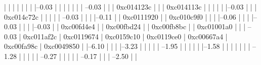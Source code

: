             |          |          |                     |          
            |          |          |                     |--0.03%
            |          |          |                     |          
            |          |          |                      --0.03%
            |          |          |                                0xc014123c
            |          |          |                                0xc014113c
            |          |          |          
            |          |          |--0.03%
            |          |          |          0xc014c72c
            |          |          |          
            |          |           --0.03%
            |          |          
            |          |--0.11%
            |          |          0xc0111920
            |          |          0xc010c9f0
            |          |          
            |          |--0.06%
            |          |          
            |          |--0.03%
            |          |          
            |          |--0.03%
            |          |          0xc00fd4e4
            |          |          0xc00fbd24
            |          |          0xc00fb8bc
            |          |          0xc01001a0
            |          |          
            |           --0.03%
            |                     0xc011af2c
            |                     0xc0119674
            |                     0xc0159c10
            |                     0xc0119ce0
            |                     0xc00667a4
            |                     0xc00fa98c
            |                     0xc0049850
            |          
            |--6.10%
            |          |          
            |          |--3.23%
            |          |          |          
            |          |           --1.95%
            |          |                     |          
            |          |                     |--1.58%
            |          |                     |          |          
            |          |                     |           --1.28%
            |          |                     |          
            |          |                      --0.27%
            |          |                                |          
            |          |                                 --0.17%
            |          |          
            |           --2.50%
            |                     |          
